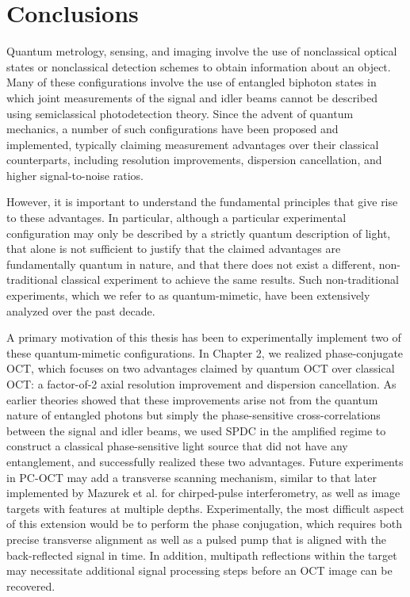 \chapter{Conclusions}

Quantum metrology, sensing, and imaging involve the use of nonclassical optical states or nonclassical detection schemes to obtain information about an object. Many of these configurations involve the use of entangled biphoton states in which joint measurements of the signal and idler beams cannot be described using semiclassical photodetection theory. Since the advent of quantum mechanics, a number of such configurations have been proposed and implemented, typically claiming measurement advantages over their classical counterparts, including resolution improvements, dispersion cancellation, and higher signal-to-noise ratios.

However, it is important to understand the fundamental principles that give rise to these advantages. In particular, although a particular experimental configuration may only be described by a strictly quantum description of light, that alone is not sufficient to justify that the claimed advantages are fundamentally quantum in nature, and that there does not exist a different, non-traditional classical experiment to achieve the same results. Such non-traditional experiments, which we refer to as quantum-mimetic, have been extensively analyzed over the past decade.

A primary motivation of this thesis has been to experimentally implement two of these quantum-mimetic configurations. In Chapter 2, we realized phase-conjugate OCT, which focuses on two advantages claimed by quantum OCT over classical OCT: a factor-of-2 axial resolution improvement and dispersion cancellation. As earlier theories showed that these improvements arise not from the quantum nature of entangled photons but simply the phase-sensitive cross-correlations between the signal and idler beams, we used SPDC in the amplified regime to construct a classical phase-sensitive light source that did not have any entanglement, and successfully realized these two advantages. Future experiments in PC-OCT may add a transverse scanning mechanism, similar to that later implemented by Mazurek et al. \cite{mazurek-dispersion} for chirped-pulse interferometry, as well as image targets with features at multiple depths. Experimentally, the most difficult aspect of this extension would be to perform the phase conjugation, which requires both precise transverse alignment as well as a pulsed pump that is aligned with the back-reflected signal in time. In addition, multipath reflections within the target may necessitate additional signal processing steps before an OCT image can be recovered.


